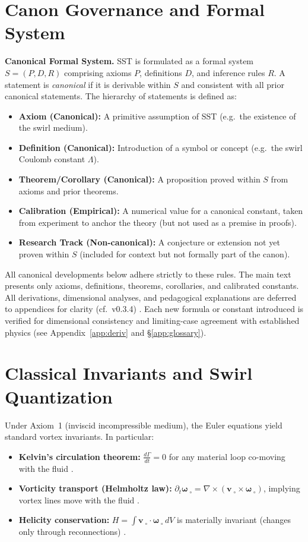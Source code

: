 \documentclass[11pt]{article}
\begin{document}
	\titlepageClose

	\section{Canon Governance and Formal System}
	\textbf{Canonical Formal System.} SST is formulated as a formal system $S = (P, D, R)$ comprising axioms $P$, definitions $D$, and inference rules $R$. A statement is \emph{canonical} if it is derivable within $S$ and consistent with all prior canonical statements. The hierarchy of statements is defined as:
	\begin{itemize}
		\item \textbf{Axiom (Canonical):} A primitive assumption of SST (e.g.\ the existence of the swirl medium).
		\item \textbf{Definition (Canonical):} Introduction of a symbol or concept (e.g.\ the swirl Coulomb constant $\Lambda$).
		\item \textbf{Theorem/Corollary (Canonical):} A proposition proved within $S$ from axioms and prior theorems.
		\item \textbf{Calibration (Empirical):} A numerical value for a canonical constant, taken from experiment to anchor the theory (but not used as a premise in proofs).
		\item \textbf{Research Track (Non-canonical):} A conjecture or extension not yet proven within $S$ (included for context but not formally part of the canon).
	\end{itemize}
	All canonical developments below adhere strictly to these rules. The main text presents only axioms, definitions, theorems, corollaries, and calibrated constants. All derivations, dimensional analyses, and pedagogical explanations are deferred to appendices for clarity (cf.\ v0.3.4) \cite{Iskandarani2025Canon034}. Each new formula or constant introduced is verified for dimensional consistency and limiting-case agreement with established physics (see Appendix~\ref{app:deriv} and \S\ref{app:glossary}).

	\section{Classical Invariants and Swirl Quantization}
	Under Axiom~1 (inviscid incompressible medium), the Euler equations yield standard vortex invariants. In particular:
	\begin{itemize}
		\item \textbf{Kelvin’s circulation theorem:} $\frac{d\Gamma}{dt}=0$ for any material loop co-moving with the fluid \cite{Batchelor1967,Saffman1992}.
		\item \textbf{Vorticity transport (Helmholtz law):} $\partial_t \boldsymbol{\omega}_{\!\!\;\circ} = \nabla \times (\mathbf{v}_{\!\!\;\circ}\times \boldsymbol{\omega}_{\!\!\;\circ})$, implying vortex lines move with the fluid \cite{Helmholtz1858,Kelvin1869}.
		\item \textbf{Helicity conservation:} $H=\int \mathbf{v}_{\!\!\;\circ}\cdot\boldsymbol{\omega}_{\!\!\;\circ}\,dV$ is materially invariant (changes only through reconnections) \cite{Moffatt1969}.
	\end{itemize}
\end{document}
